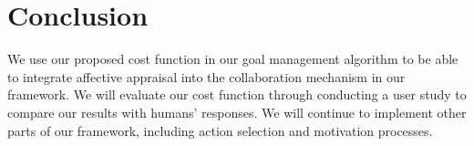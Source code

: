 \documentclass[conference]{IEEEtran}
\begin{document}

\vspace*{-2mm}
\section{Conclusion}

We use our proposed cost function in our goal management algorithm to be able to
integrate affective appraisal into the collaboration mechanism in our framework.
We will evaluate our cost function through conducting a user study to compare
our results with humans' responses. We will continue to implement other parts of
our framework, including action selection and motivation processes.
\vspace*{-2mm}





%
%
%



\end{document}
